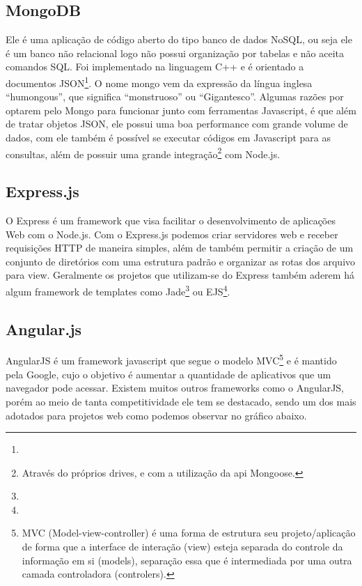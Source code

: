 \subsection{MongoDB}
Ele é uma aplicação de código aberto do tipo banco de dados NoSQL, ou seja ele é um banco não relacional logo não possui organização por tabelas e não aceita comandos SQL. Foi implementado na linguagem  C++ e é orientado a documentos JSON\footnote{}. 
O nome mongo vem da expressão da língua inglesa “humongous”,  que significa “monstruoso” ou “Gigantesco”. 
Algumas razões por optarem pelo Mongo para funcionar junto com ferramentas Javascript, é que além de tratar objetos JSON, ele possui uma boa performance com grande volume de dados, com ele também é possível se executar códigos em Javascript  para as consultas, além de possuir uma grande integração\footnote{Através do próprios drives, e com a utilização da api Mongoose.} com Node.js.    


\subsection{Express.js}
O Express é um framework que visa facilitar o desenvolvimento de aplicações Web com o Node.js. Com o Express.js podemos criar servidores web e receber requisições HTTP de maneira simples, além de também permitir a criação de um conjunto de diretórios com uma estrutura padrão e organizar as rotas dos arquivo para view. Geralmente os projetos que utilizam-se do Express também aderem há algum framework de templates como Jade\footnote{} ou EJS\footnote{}.


\subsection{Angular.js}

AngularJS é um framework javascript que segue o modelo MVC\footnote{MVC (Model-view-controller) é uma forma de estrutura seu projeto/aplicação de forma que a interface de interação (view) esteja separada do controle da informação em si (models), separação essa que é intermediada por uma outra camada controladora (controlers).} e é mantido pela Google, cujo o objetivo é aumentar a quantidade de aplicativos que um navegador pode acessar.
Existem muitos outros frameworks como o AngularJS, porém ao meio de tanta competitividade ele tem se destacado, sendo um dos mais adotados para projetos web como podemos observar no gráfico abaixo.


